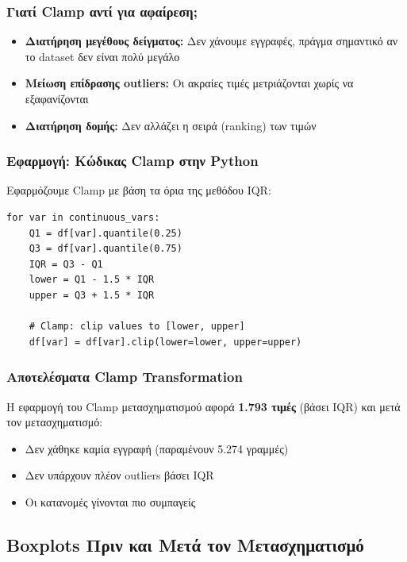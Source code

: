 \documentclass[12pt,a4paper]{article}
\begin{document}
\subsubsection{Γιατί Clamp αντί για αφαίρεση;}

\begin{itemize}
    \item {\textbf{Διατήρηση μεγέθους δείγματος:}} Δεν χάνουμε εγγραφές, πράγμα σημαντικό αν το dataset δεν είναι πολύ μεγάλο
    \item \textbf{Μείωση επίδρασης outliers:} Οι ακραίες τιμές μετριάζονται χωρίς να εξαφανίζονται
    \item \textbf{Διατήρηση δομής:} Δεν αλλάζει η σειρά (ranking) των τιμών
\end{itemize}

\subsubsection{Εφαρμογή: Κώδικας Clamp στην Python}

Εφαρμόζουμε Clamp με βάση τα όρια της μεθόδου IQR:

\begin{lstlisting}
for var in continuous_vars:
    Q1 = df[var].quantile(0.25)
    Q3 = df[var].quantile(0.75)
    IQR = Q3 - Q1
    lower = Q1 - 1.5 * IQR
    upper = Q3 + 1.5 * IQR

    # Clamp: clip values to [lower, upper]
    df[var] = df[var].clip(lower=lower, upper=upper)
\end{lstlisting}

\subsubsection{Αποτελέσματα Clamp Transformation}

Η εφαρμογή του Clamp μετασχηματισμού αφορά \textbf{1.793 τιμές} (βάσει IQR) και μετά τον μετασχηματισμό:

\begin{itemize}
    \item Δεν χάθηκε καμία εγγραφή (παραμένουν 5.274 γραμμές)
    \item Δεν υπάρχουν πλέον outliers βάσει IQR
    \item Οι κατανομές γίνονται πιο συμπαγείς
\end{itemize}

\subsection{Boxplots Πριν και Μετά τον Μετασχηματισμό}
\end{document}
